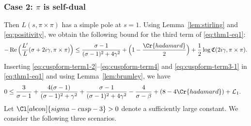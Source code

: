 \documentclass[12pt,reqno]{amsart}
\theoremstyle{remark}
\DeclareMathOperator{\Real}{Re}
\newcommand{\Q}{\mathbb{Q}}
\numberwithin{equation}{section}
\begin{document}
 \subsubsection{Case 2: \texorpdfstring{$\pi$}{pi} is self-dual}\label{subsubsec:Thm1-case2} Then $L(s, \pi \times \pi)$ has a simple pole at $s=1$. Using Lemma~\ref{lem:stirling} and \eqref{eq:positivity}, we obtain the following bound for the third term of \eqref{eq:thm1-eq1}:
\begin{equation}
	\label{eq:cuspform-term3-1}
	-\Real\Big(\frac{L'}{L}(\sigma+2i\gamma, \pi \times \pi)\Big) \le \frac{\sigma-1}{(\sigma-1)^2 +4\gamma^2}
	+\Big(1 -\frac{\Cr{hadamard}}{2}\Big)+ \frac{1}{2}\log \mathfrak{C}(2i\gamma, \pi \times \pi).
\end{equation}
Inserting \eqref{eq:cuspform-term1-2}--\eqref{eq:cuspform-term4} and \eqref{eq:cuspform-term3-1} in \eqref{eq:thm1-eq1} and using Lemma~\ref{lem:brumley}, we have
\begin{equation}
	\label{eq:cusp-case2}
	\begin{aligned}
		0 %
		&\le \frac{3}{\sigma-1}+ \frac{4(\sigma-1)}{(\sigma-1)^2+\gamma^2} + \frac{\sigma-1}{(\sigma-1)^2 +4\gamma^2} - \frac{4}{\sigma-\beta}+ (8-4\Cr{hadamard})+\mathcal{L}_1. %
	\end{aligned}
\end{equation}
    Let $\Cl[abcon]{sigma-cusp-3}>0$ denote a sufficiently large constant.
    We consider the following three scenarios.
\end{document}
